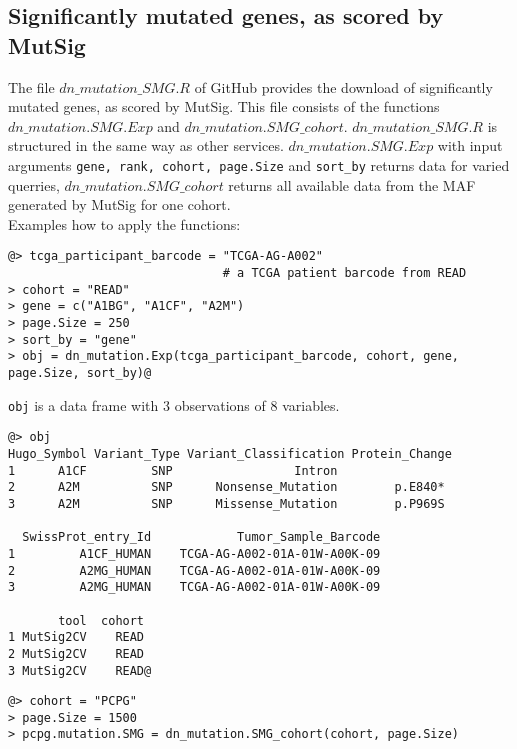 \documentclass{TechReport}
\begin{document}
\subsection{Significantly mutated genes, as scored by MutSig}
The file $dn\_mutation\_SMG.R$ of GitHub provides the download of significantly
mutated genes, as scored by MutSig. This file consists of the functions 
$dn\_mutation.SMG.Exp$ and $dn\_mutation.SMG\_cohort$. $dn\_mutation\_SMG.R$ is
structured in the same way as other services.
$dn\_mutation.SMG.Exp$ with input arguments {\tt gene, rank, cohort, page.Size} and
{\tt sort\_by} returns data for varied querries,
$dn\_mutation.SMG\_cohort$ returns all available data from the MAF generated by
MutSig for one cohort.\\
Examples how to apply the functions:
\begin{lstlisting}[style=base]
@> tcga_participant_barcode = "TCGA-AG-A002" 
                              # a TCGA patient barcode from READ
> cohort = "READ"
> gene = c("A1BG", "A1CF", "A2M")
> page.Size = 250
> sort_by = "gene"
> obj = dn_mutation.Exp(tcga_participant_barcode, cohort, gene, 
page.Size, sort_by)@
\end{lstlisting}
{\tt obj} is a data frame with 3 observations of 8 variables.
\begin{lstlisting}[style=base]
@> obj
Hugo_Symbol Variant_Type Variant_Classification Protein_Change 
1      A1CF         SNP                 Intron                        
2      A2M          SNP      Nonsense_Mutation        p.E840*         
3      A2M          SNP      Missense_Mutation        p.P969S    

  SwissProt_entry_Id            Tumor_Sample_Barcode       
1         A1CF_HUMAN    TCGA-AG-A002-01A-01W-A00K-09    
2         A2MG_HUMAN    TCGA-AG-A002-01A-01W-A00K-09     
3         A2MG_HUMAN    TCGA-AG-A002-01A-01W-A00K-09     

       tool  cohort
1 MutSig2CV    READ
2 MutSig2CV    READ
3 MutSig2CV    READ@
\end{lstlisting}



\begin{lstlisting}[style=base]
@> cohort = "PCPG"
> page.Size = 1500
> pcpg.mutation.SMG = dn_mutation.SMG_cohort(cohort, page.Size)
\end{lstlisting}
\end{document}

